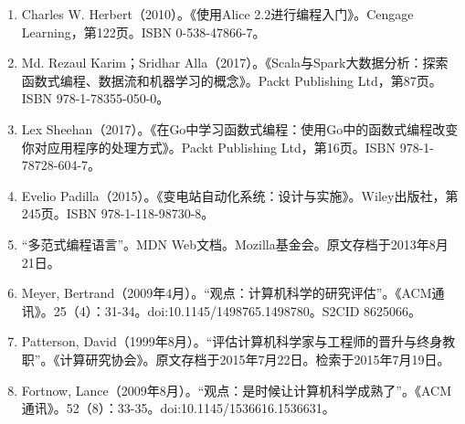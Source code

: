\begin{enumerate}
\item Charles W. Herbert（2010）。《使用Alice 2.2进行编程入门》。Cengage Learning，第122页。ISBN 0-538-47866-7。  
\item Md. Rezaul Karim；Sridhar Alla（2017）。《Scala与Spark大数据分析：探索函数式编程、数据流和机器学习的概念》。Packt Publishing Ltd，第87页。ISBN 978-1-78355-050-0。  
\item Lex Sheehan（2017）。《在Go中学习函数式编程：使用Go中的函数式编程改变你对应用程序的处理方式》。Packt Publishing Ltd，第16页。ISBN 978-1-78728-604-7。  
\item Evelio Padilla（2015）。《变电站自动化系统：设计与实施》。Wiley出版社，第245页。ISBN 978-1-118-98730-8。  
\item “多范式编程语言”。MDN Web文档。Mozilla基金会。原文存档于2013年8月21日。  
\item Meyer, Bertrand（2009年4月）。“观点：计算机科学的研究评估”。《ACM通讯》。25（4）：31-34。doi:10.1145/1498765.1498780。S2CID 8625066。  
\item Patterson, David（1999年8月）。“评估计算机科学家与工程师的晋升与终身教职”。《计算研究协会》。原文存档于2015年7月22日。检索于2015年7月19日。  
\item Fortnow, Lance（2009年8月）。“观点：是时候让计算机科学成熟了”。《ACM通讯》。52（8）：33-35。doi:10.1145/1536616.1536631。
\end{enumerate}